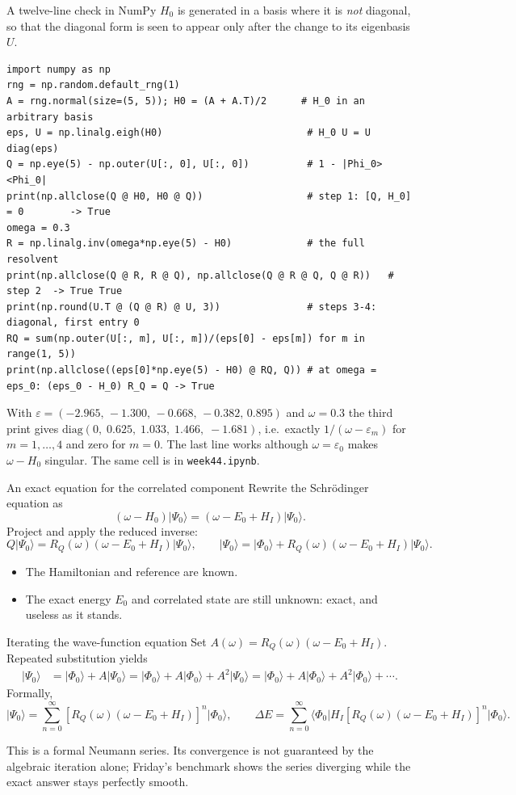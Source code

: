\documentclass[aspectratio=169,10pt]{beamer}
\newcommand{\warnbox}[1]{%
  \begin{tcolorbox}[colback=palewarm,colframe=warm,title={\bfseries A trap to avoid}]
  #1
  \end{tcolorbox}}
\newcommand{\numbox}[1]{%
  \begin{tcolorbox}[colback=palegreen,colframe=teal!70!black,title={\bfseries Measured}]
  #1
  \end{tcolorbox}}
\newcommand{\ket}[1]{\vert #1\rangle}
\newcommand{\mel}[3]{\langle #1\lvert #2\rvert #3\rangle}
\newcommand{\ph}{\Phi_0}
\newcommand{\Psizero}{\Psi_0}
\begin{document}
\begin{frame}[fragile,shrink=6]{A twelve-line check in NumPy}
\(H_0\) is generated in a basis where it is \emph{not} diagonal, so that the diagonal form is seen to appear only after the change to its eigenbasis \(U\).
\begin{lstlisting}
import numpy as np
rng = np.random.default_rng(1)
A = rng.normal(size=(5, 5)); H0 = (A + A.T)/2      # H_0 in an arbitrary basis
eps, U = np.linalg.eigh(H0)                         # H_0 U = U diag(eps)
Q = np.eye(5) - np.outer(U[:, 0], U[:, 0])          # 1 - |Phi_0><Phi_0|
print(np.allclose(Q @ H0, H0 @ Q))                  # step 1: [Q, H_0] = 0        -> True
omega = 0.3
R = np.linalg.inv(omega*np.eye(5) - H0)             # the full resolvent
print(np.allclose(Q @ R, R @ Q), np.allclose(Q @ R @ Q, Q @ R))   # step 2  -> True True
print(np.round(U.T @ (Q @ R) @ U, 3))               # steps 3-4: diagonal, first entry 0
RQ = sum(np.outer(U[:, m], U[:, m])/(eps[0] - eps[m]) for m in range(1, 5))
print(np.allclose((eps[0]*np.eye(5) - H0) @ RQ, Q)) # at omega = eps_0: (eps_0 - H_0) R_Q = Q -> True
\end{lstlisting}
\numbox{With \(\varepsilon=(-2.965,\,-1.300,\,-0.668,\,-0.382,\,0.895)\) and \(\omega=0.3\) the third print gives
\(\mathrm{diag}(0,\;0.625,\;1.033,\;1.466,\;-1.681)\), i.e.\ exactly \(1/(\omega-\varepsilon_m)\) for \(m=1,\dots,4\) and zero for \(m=0\). The last line works although \(\omega=\varepsilon_0\) makes \(\omega-H_0\) singular. The same cell is in \texttt{week44.ipynb}.}
\end{frame}

\begin{frame}{An exact equation for the correlated component}
Rewrite the Schr\"odinger equation as
\[
(\omega-H_0)\ket{\Psizero}=(\omega-E_0+H_I)\ket{\Psizero}.
\]
Project and apply the reduced inverse:
\[
Q\ket{\Psizero}=R_Q(\omega)(\omega-E_0+H_I)\ket{\Psizero},
\qquad
\boxed{\ket{\Psizero}=\ket{\ph}
+R_Q(\omega)(\omega-E_0+H_I)\ket{\Psizero}.}
\]
\begin{itemize}
\item The Hamiltonian and reference are known.
\item The exact energy \(E_0\) and correlated state are still unknown: exact, and useless as it stands.
\end{itemize}
\end{frame}

\begin{frame}{Iterating the wave-function equation}
Set \(A(\omega)=R_Q(\omega)(\omega-E_0+H_I)\). Repeated substitution yields
\begin{align*}
\ket{\Psizero}&=\ket{\ph}+A\ket{\Psizero}
=\ket{\ph}+A\ket{\ph}+A^2\ket{\Psizero}
=\ket{\ph}+A\ket{\ph}+A^2\ket{\ph}+\cdots.
\end{align*}
Formally,
\[
\boxed{\ket{\Psizero}=\sum_{n=0}^{\infty}
\left[R_Q(\omega)(\omega-E_0+H_I)\right]^n\ket{\ph},}
\qquad
\Delta E=\sum_{n=0}^{\infty}
\mel{\ph}{H_I\left[R_Q(\omega)(\omega-E_0+H_I)\right]^n}{\ph}.
\]
\warnbox{This is a formal Neumann series. Its convergence is not guaranteed by the algebraic iteration alone; Friday's benchmark shows the series diverging while the exact answer stays perfectly smooth.}
\end{frame}
\end{document}
